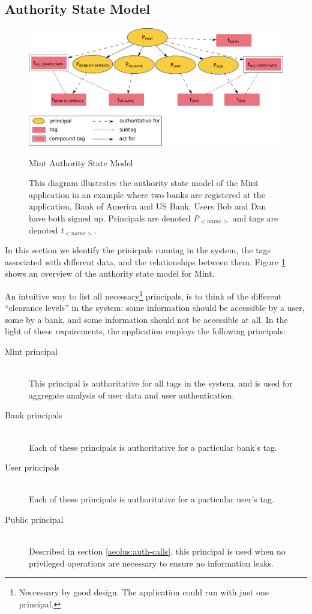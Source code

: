 \subsection{Authority State Model}

\begin{figure}[h]
\centering
\includegraphics[width=\textwidth,height=\textheight,keepaspectratio]{figures/mint-auth-state-model}
\caption*{Mint Authority State Model}
\caption{This diagram illustrates the authority state model of the Mint application in an example where two banks are registered at the application, Bank of America and US Bank. Users Bob and Dan have both signed up. Principals are denoted \emph{P$_{<name>}$} and tags are denoted \emph{t$_{<name>}$}.}
\label{fig:mint-auth-state-model}
\end{figure}


In this section we identify the prinicpals running in the system, the tags associated with different data, and the relationships between them. Figure \ref{fig:mint-auth-state-model} shows an overview of the authority state model for Mint.

An intuitive way to list all necessary\footnote{Neccessary by good design. The application could run with just one principal.} principals, is to think of the different ``clearance levels'' in the system: some information should be accessible by a user, some by a bank, and some information should not be accessible at all. In the light of these requirements, the application employs the following principals:
\begin{description}
  \item[Mint principal] \ \\
    This principal is authoritative for all tags in the system, and is
    used for aggregate analysis of user data and
    user authentication.
  \item[Bank principals] \ \\
    Each of these principals is authoritative for a particular bank's tag.
  \item[User principals] \ \\
    Each of these principals is authoritative for a particular user's tag.
  \item[Public principal] \ \\
    Described in section \ref{aeolus:auth-calls}, this
    principal is used when no privileged operations are 
    necessary to ensure no information leaks.
\end{description}

